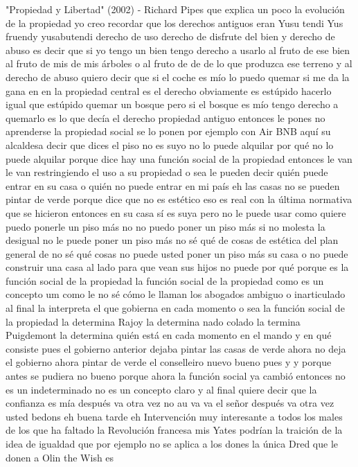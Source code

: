 "Propiedad y Libertad" (2002) - Richard Pipes
que explica un poco la evolución de la propiedad yo creo recordar que los derechos antiguos eran Yusu tendi Yus fruendy yusabutendi
derecho de uso derecho de disfrute del bien y derecho de abuso es decir que si yo tengo un bien
tengo derecho a usarlo al fruto de ese bien al fruto de mis de mis árboles o al fruto de de de lo que produzca ese terreno
y al derecho de abuso quiero decir que si el coche es mío lo puedo quemar si me da la gana
en en la propiedad central es el derecho obviamente es estúpido hacerlo igual que estúpido quemar un bosque
pero si el bosque es mío tengo derecho a quemarlo es lo que decía el derecho propiedad antiguo entonces le pones no aprenderse la propiedad social
se lo ponen por ejemplo con Air BNB aquí su alcaldesa decir que dices el piso no es suyo no lo puede alquilar
por qué no lo puede alquilar porque dice hay una función social de la propiedad entonces le van le van restringiendo el uso a su propiedad
o sea le pueden decir quién puede entrar en su casa o quién no puede entrar en mi país eh las casas no se pueden pintar de verde
porque dice que no es estético eso es real con la última normativa que se hicieron entonces en su casa sí es suya pero no le puede usar como quiere
puedo ponerle un piso más no no puedo poner un piso más si no molesta la desigual no le puede poner un piso más no sé qué de cosas de estética
del plan general de no sé qué cosas no puede usted poner un piso más su casa o no puede construir una casa al lado para que vean sus hijos
no puede por qué porque es la función social de la propiedad la función social de la propiedad como es un concepto um como le no sé cómo le llaman los abogados
ambiguo o inarticulado al final la interpreta el que gobierna en cada momento
o sea la función social de la propiedad la determina Rajoy la determina nado colado la termina Puigdemont la determina
quién está en cada momento en el mando y en qué consiste pues el gobierno anterior dejaba pintar las casas de verde ahora no deja
el gobierno ahora pintar de verde el conselleiro nuevo bueno pues y y porque antes se pudiera no
bueno porque ahora la función social ya cambió entonces no es un indeterminado no es un concepto claro
y al final quiere decir que la confianza es mía después va otra vez no au va
va el señor después va otra vez usted bedons eh buena tarde eh
Intervención
muy interesante a todos los males de los que ha faltado la Revolución francesa mis Yates podrían
la traición de la idea de igualdad que por ejemplo no se aplica a los dones la única Dred que le donen a Olin the Wish es
